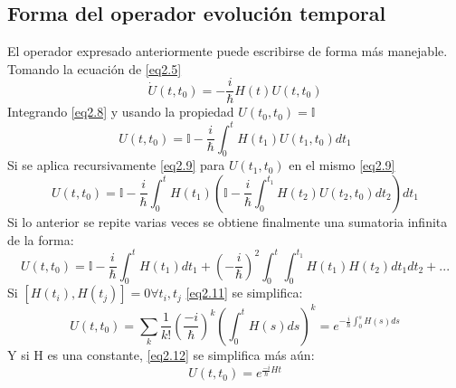 \documentclass{book}
\begin{document}
\subsection{{Forma del operador evolución temporal}}
El operador expresado anteriormente puede escribirse de forma más manejable. Tomando la ecuación de \ref{eq2.5}
\begin{equation}\label{eq2.8}\dot{U}(t,t_0)=-\frac{i}{\hslash}H(t)U(t,t_0)\end{equation} Integrando \ref{eq2.8} y usando la propiedad $U(t_0,t_0)=\mathbb{I}$
\begin{equation}\label{eq2.9}U(t,t_0)=\mathbb{I}-\frac{i}{\hslash}\int_0^t H(t_1)U(t_1,t_0)dt_1\end{equation} Si se aplica recursivamente \ref{eq2.9} para $U(t_1,t_0)$ en el mismo \ref{eq2.9}
\begin{equation}\label{eq2.10} U(t,t_0)=\mathbb{I}-\frac{i}{\hslash}\int_0^tH(t_1)(\mathbb{I}-\frac{i}{\hslash}\int_0^{t_1} H(t_2)U(t_2,t_0) dt_2)dt_1\end{equation}
Si lo anterior se repite varias veces se obtiene finalmente una sumatoria infinita de la forma:
\begin{equation}\label{eq2.11}U(t,t_0)=\mathbb{I}-\frac{i}{\hslash}\int_0^t H(t_1) dt_1+(-\frac{i}{\hslash})^2\int_0^t\int_0^{t_1} H(t_1)H(t_2)dt_1dt_2 + ...\end{equation}
Si $[H(t_i),H(t_j)]=0 \forall t_i,t_j$ \ref{eq2.11} se simplifica: \begin{equation}\label{eq2.12}U(t,t_0)=\sum_k \frac{1}{k!}(\frac{-i}{\hslash})^k (\int_0^tH(s)ds)^k=e^{-\frac{i}{\hslash}\int_0^s H(s)ds}\end{equation}
Y si H es una constante, \ref{eq2.12} se simplifica más aún:
\begin{equation}U(t,t_0)=e^{\frac{-i}{\hslash}Ht}\end{equation}
\end{document}
